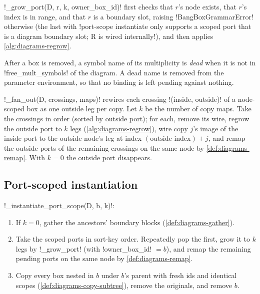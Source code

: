 \py!_grow_port(D, r, k, owner_box_id)! first checks that $r$'s node exists, that $r$'s index is in range, and that $r$ is a boundary slot, raising \py!BangBoxGrammarError! otherwise (the last with \code!port-scope instantiate only supports a scoped port that is a diagram boundary slot; R is wired internally!), and then applies \cref{alg:diagrams-regrow}.

\begin{definition}\label{def:diagrams-purge}
After a box is removed, a symbol name of its multiplicity is \emph{dead} when it is not in \py!free_mult_symbols! of the diagram. A dead name is removed from the parameter environment, so that no binding is left pending against nothing.
\end{definition}

\begin{algorithm}\label{alg:diagrams-fanout}
\py!_fan_out(D, crossings, maps)! rewires each crossing \py!(inside, outside)! of a node-scoped box as one outside leg per copy. Let $k$ be the number of copy maps. Take the crossings in order (sorted by outside port); for each, remove its wire, regrow the outside port to $k$ legs (\cref{alg:diagrams-regrow}), wire copy $j$'s image of the inside port to the outside node's leg at index $(\text{outside index})+j$, and remap the outside ports of the remaining crossings on the same node by \cref{def:diagrams-remap}. With $k=0$ the outside port disappears.
\end{algorithm}

\subsection{Port-scoped instantiation}

\begin{algorithm}\label{alg:diagrams-port-scope}
\py!_instantiate_port_scope(D, b, k)!:
\begin{enumerate}
\item If $k=0$, gather the ancestors' boundary blocks (\cref{def:diagrams-gather}).
\item Take the scoped ports in sort-key order. Repeatedly pop the first, grow it to $k$ legs by \py!_grow_port! (with \py!owner_box_id! $=b$), and remap the remaining pending ports on the same node by \cref{def:diagrams-remap}.
\item Copy every box nested in $b$ under $b$'s parent with fresh ids and identical scopes (\cref{def:diagrams-copy-subtree}), remove the originals, and remove $b$.
\end{enumerate}
\end{algorithm}

